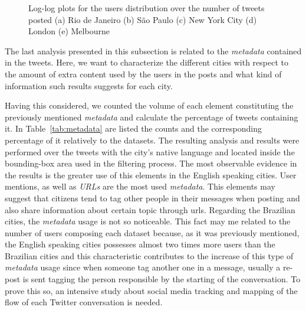 \begin{figure}[h]
	\caption[Five numerical solutions]{Log-log plots for the users distribution over the number of tweets posted (a) Rio de Janeiro (b) São Paulo (c) New York City (d) London (e) Melbourne}
	\label{fig:loglog-plots-users}
\end{figure}

The last analysis presented in this subsection is related to the \textit{metadata} contained in the tweets. Here, we want to characterize the different cities with respect to the amount of extra content used by the users in the posts and what kind of information such results suggests for each city.

Having this considered, we counted the volume of each element constituting the previously mentioned \textit{metadata} and calculate the percentage of tweets containing it. In Table~\ref{tab:metadata} are listed the counts and the corresponding percentage of it relatively to the datasets. The resulting analysis and results were performed over the tweets with the city's native language and located inside the bounding-box area used in the filtering process.
The most observable evidence in the results is the greater use of this elements in the English speaking cities. User mentions, as well as \textit{URLs} are the most used \textit{metadata}. This elements may suggest that citizens tend to tag other people in their messages when posting and also share information about certain topic through urls. Regarding the Brazilian cities, the \textit{metadata} usage is not so noticeable. This fact may me related to the number of users composing each dataset because, as it was previously mentioned, the English speaking cities possesses almost two times more users than the Brazilian cities and this characteristic contributes to the increase of this type of \textit{metadata} usage since when someone tag another one in a message, usually a re-post is sent tagging the person responsible by the starting of the conversation. To prove this so, an intensive study about social media tracking and mapping of the flow of each Twitter conversation is needed.

